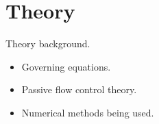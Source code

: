 \section{Theory}
Theory background.
\begin{itemize}
 \item Governing equations.
 \item Passive flow control theory.
 \item Numerical methods being used.
\end{itemize}

